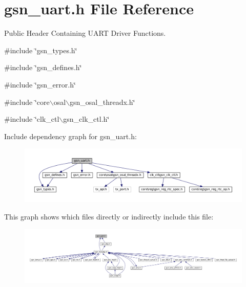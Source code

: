 \hypertarget{a00600}{
\section{gsn\_\-uart.h File Reference}
\label{a00600}
}


Public Header Containing UART Driver Functions.  


{\ttfamily \#include \char`\"{}gsn\_\-types.h\char`\"{}}\par
{\ttfamily \#include \char`\"{}gsn\_\-defines.h\char`\"{}}\par
{\ttfamily \#include \char`\"{}gsn\_\-error.h\char`\"{}}\par
{\ttfamily \#include \char`\"{}core$\backslash$osal$\backslash$gsn\_\-osal\_\-threadx.h\char`\"{}}\par
{\ttfamily \#include \char`\"{}clk\_\-ctl$\backslash$gsn\_\-clk\_\-ctl.h\char`\"{}}\par
Include dependency graph for gsn\_\-uart.h:
\nopagebreak
\begin{figure}[H]
\begin{center}
\leavevmode
\includegraphics[width=400pt]{a00846}
\end{center}
\end{figure}
This graph shows which files directly or indirectly include this file:
\nopagebreak
\begin{figure}[H]
\begin{center}
\leavevmode
\includegraphics[width=400pt]{a00847}
\end{center}
\end{figure}
